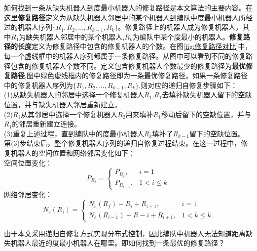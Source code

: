 如何找到一条从缺失机器人到度最小机器人的修复路径是本文算法的主要内容。在这里\textbf{修复路径}定义为从缺失机器人邻居中的某个机器人到编队中度最小机器人所经过的机器人序列$\{R_1,R_2,\dots,R_{k-1},R_k\}$。修复路径上的机器人成为修复机器人，其中$R_1$为缺失机器人邻居中的某个机器人,$R_k$为编队中某个度最小的机器人。\textbf{修复路径的长度}定义为修复路径中包含的修复机器人的个数。在图\ref{fig:修复路径对比}中，每一个虚线框中的机器人序列都属于一条修复路径。从图中可以看到不同的修复路径包含的修复机器人个数不同。定义包含修复机器人个数最少的修复路径为\textbf{最优修复路径},图中绿色虚线框内的修复路径即为一条最优修复路径。如果一条修复路径中的修复机器人序列为$\{R_1,R_2,\dots,R_{k-1},R_k\}$,则对应的递归自修复步骤如下：\\
\indent (1)从缺失机器人的邻居中选择一个修复机器人$R_1$,$R_1$去填补缺失机器人留下的空缺位置，并与缺失机器人邻居重新建立。\\
\indent (2)$R_1$从其邻居中选择一个修复机器人$R_2$用来填补$R_1$移动后留下的空缺位置，并与$R_1$的邻居重新建立连接。\\
\indent (3)重复上述过程，直到编队中的度最小机器人$R_k$填补了$R_{k-1}$留下的空缺位置。\\
第(3)步结束后，整个修复机器人序列的递归自修复过程结束。在这一过程中，修复机器人的空间位置和网络邻居变化如下：\\
空间位置变化：\\
\begin{equation}
	P_{R_i} = 
	\begin{cases}
		P_{R_f}, & i=1 \\
		P_{R_{i-1}}, & 1 < i \leq k
	\end{cases}
\end{equation}
网络邻居变化：\\
\begin{equation}
	N_e(R_i) = 
	\begin{cases}
		N_e(R_f) - R_i + R_{i+1}, & i = 1 \\
		N_e(R_{i-1}) - R-i + R_{i+1}, & 1<k \leq k
	\end{cases}
\end{equation}

由于本文采用递归自修复方式实现分布式控制，因此编队中机器人无法知道距离缺失机器人最近的度最小机器人在哪里。即如何找到一条最优的修复路径？

